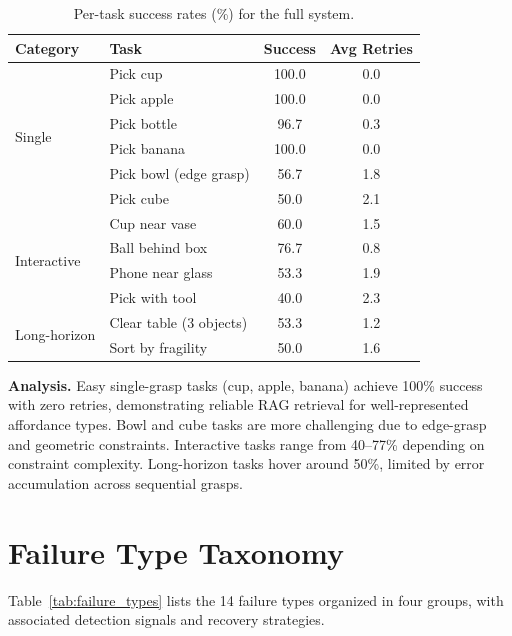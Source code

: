 \documentclass[letterpaper, 10pt]{article}
\begin{document}
\begin{table}[h]
\centering
\caption{Per-task success rates (\%) for the full system.}
\label{tab:per_task}
\setlength{\tabcolsep}{3pt}
\begin{tabular}{@{}llcc@{}}
\toprule
\textbf{Category} & \textbf{Task} & \textbf{Success} & \textbf{Avg Retries} \\
\midrule
\multirow{6}{*}{Single} & Pick cup & 100.0 & 0.0 \\
 & Pick apple & 100.0 & 0.0 \\
 & Pick bottle & 96.7 & 0.3 \\
 & Pick banana & 100.0 & 0.0 \\
 & Pick bowl (edge grasp) & 56.7 & 1.8 \\
 & Pick cube & 50.0 & 2.1 \\
\midrule
\multirow{4}{*}{Interactive} & Cup near vase & 60.0 & 1.5 \\
 & Ball behind box & 76.7 & 0.8 \\
 & Phone near glass & 53.3 & 1.9 \\
 & Pick with tool & 40.0 & 2.3 \\
\midrule
\multirow{2}{*}{Long-horizon} & Clear table (3 objects) & 53.3 & 1.2 \\
 & Sort by fragility & 50.0 & 1.6 \\
\bottomrule
\end{tabular}
\end{table}

\textbf{Analysis.}
Easy single-grasp tasks (cup, apple, banana) achieve 100\% success with zero retries, demonstrating reliable RAG retrieval for well-represented affordance types.
Bowl and cube tasks are more challenging due to edge-grasp and geometric constraints.
Interactive tasks range from 40--77\% depending on constraint complexity.
Long-horizon tasks hover around 50\%, limited by error accumulation across sequential grasps.

\section{Failure Type Taxonomy}

Table~\ref{tab:failure_types} lists the 14 failure types organized in four groups, with associated detection signals and recovery strategies.
\end{document}
